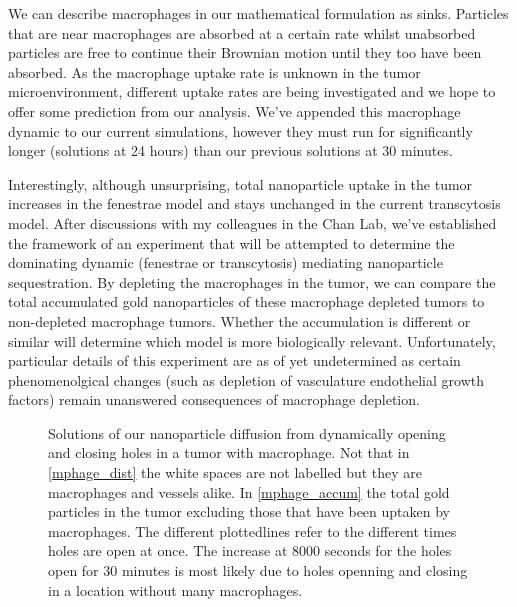 We can describe macrophages in our mathematical formulation as sinks. 
Particles that are near macrophages are absorbed at a certain rate whilst unabsorbed particles are free to continue their Brownian motion until they too have been absorbed.
As the macrophage uptake rate is unknown in the tumor microenvironment, different uptake rates are being investigated and we hope to offer some prediction from our analysis.
We've appended this macrophage dynamic to our current simulations, however they must run for significantly longer (solutions at 24 hours) than our previous solutions at 30 minutes.

Interestingly, although unsurprising, total nanoparticle uptake in the tumor increases in the fenestrae model and stays unchanged in the current transcytosis model.
After discussions with my colleagues in the Chan Lab, we've established the framework of an experiment that will be attempted to determine the dominating dynamic (fenestrae or transcytosis) mediating nanoparticle sequestration.
By depleting the macrophages in the tumor, we can compare the total accumulated gold nanoparticles of these macrophage depleted tumors to non-depleted macrophage tumors. 
Whether the accumulation is different or similar will determine which model is more biologically relevant.
Unfortunately, particular details of this experiment are as of yet undetermined as certain phenomenolgical changes (such as depletion of vasculature endothelial growth factors) remain unanswered consequences of macrophage depletion.

\begin{figure}[h!]
\centering
{}
\caption{\label{fig:fenestrae} Solutions of our nanoparticle diffusion from dynamically opening and closing holes in a tumor with macrophage. Not that in \ref{mphage_dist} the white spaces are not labelled but they are macrophages and vessels alike. In \ref{mphage_accum} the total gold particles in the tumor excluding those that have been uptaken by macrophages. The different plottedlines refer to the different times holes are open at once. The increase at 8000 seconds for the holes open for 30 minutes is most likely due to holes openning and closing in a location without many macrophages.}
\end{figure}